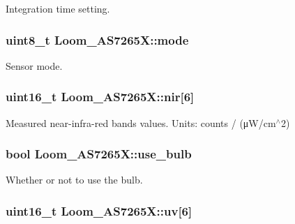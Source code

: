 Integration time setting. 

\subsubsection[{\texorpdfstring{mode}{mode}}]{\setlength{\rightskip}{0pt plus 5cm}uint8\+\_\+t Loom\+\_\+\+A\+S7265\+X\+::mode\hspace{0.3cm}{\ttfamily [protected]}}\hypertarget{class_loom___a_s7265_x_a02bc2eaf8dfea91f9f47a19f49dcc1e9}{}\label{class_loom___a_s7265_x_a02bc2eaf8dfea91f9f47a19f49dcc1e9}


Sensor mode. 

\subsubsection[{\texorpdfstring{nir}{nir}}]{\setlength{\rightskip}{0pt plus 5cm}uint16\+\_\+t Loom\+\_\+\+A\+S7265\+X\+::nir\mbox{[}6\mbox{]}\hspace{0.3cm}{\ttfamily [protected]}}\hypertarget{class_loom___a_s7265_x_a6f2c89c5aed39f75a275f37ce3ea21bd}{}\label{class_loom___a_s7265_x_a6f2c89c5aed39f75a275f37ce3ea21bd}


Measured near-\/infra-\/red bands values. Units\+: counts / (μ\+W/cm$^\wedge$2) 

\subsubsection[{\texorpdfstring{use\+\_\+bulb}{use_bulb}}]{\setlength{\rightskip}{0pt plus 5cm}bool Loom\+\_\+\+A\+S7265\+X\+::use\+\_\+bulb\hspace{0.3cm}{\ttfamily [protected]}}\hypertarget{class_loom___a_s7265_x_a33831b2827d06b2114225b57862445f7}{}\label{class_loom___a_s7265_x_a33831b2827d06b2114225b57862445f7}


Whether or not to use the bulb. 

\subsubsection[{\texorpdfstring{uv}{uv}}]{\setlength{\rightskip}{0pt plus 5cm}uint16\+\_\+t Loom\+\_\+\+A\+S7265\+X\+::uv\mbox{[}6\mbox{]}\hspace{0.3cm}{\ttfamily [protected]}}\hypertarget{class_loom___a_s7265_x_a0724af751e2f38c7f71fc5828910f6fe}{}\label{class_loom___a_s7265_x_a0724af751e2f38c7f71fc5828910f6fe}


